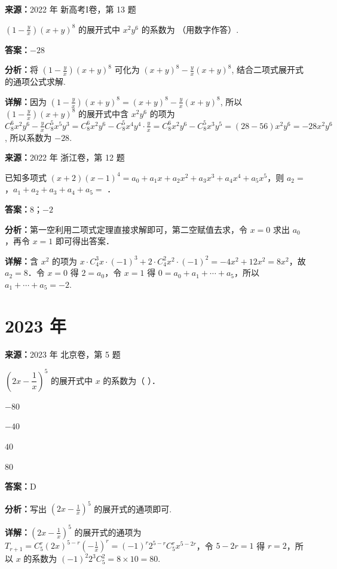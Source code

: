 \begin{question}[points=5]
\textbf{来源：}2022 年 新高考I卷，第 13 题\par
$\left(1 - \frac{y}{x}\right)(x + y)^8$ 的展开式中 $x^2 y^6$ 的系数为 （用数字作答）.
\fillin[{$-28$}]
\begin{solution}
\textbf{答案：}$-28$

\textbf{分析：}将 $\left(1 - \frac{y}{x}\right)(x + y)^8$ 可化为 $(x + y)^8 - \frac{y}{x}(x + y)^8$, 结合二项式展开式的通项公式求解.

\textbf{详解：}因为 $\left(1 - \frac{y}{x}\right)(x + y)^8 = (x + y)^8 - \frac{y}{x}(x + y)^8$, 所以 $\left(1 - \frac{y}{x}\right)(x + y)^8$ 的展开式中含 $x^2 y^6$ 的项为 $C_8^6 x^2 y^6 - \frac{y}{x} C_8^5 x^5 y^3 = C_8^6 x^2 y^6 - C_8^5 x^4 y^4 \cdot \frac{y}{x} = C_8^6 x^2 y^6 - C_8^5 x^3 y^5 = (28 - 56) x^2 y^6 = -28 x^2 y^6$, 所以系数为 $-28$.
\end{solution}
\end{question}

\begin{question}[points=6]
\textbf{来源：}2022 年 浙江卷，第 12 题\par
已知多项式 $(x+2)(x-1)^4 = a_0 + a_1 x + a_2 x^2 + a_3 x^3 + a_4 x^4 + a_5 x^5$，则 $a_2 =$ ，$a_1 + a_2 + a_3 + a_4 + a_5 =$ ．
\fillin[{$8$；$-2$}]
\begin{solution}
\textbf{答案：}$8$；$-2$

\textbf{分析：}第一空利用二项式定理直接求解即可，第二空赋值去求，令 $x=0$ 求出 $a_0$，再令 $x=1$ 即可得出答案．

\textbf{详解：}含 $x^2$ 的项为 $x\cdot C_4^3 x \cdot (-1)^3 + 2\cdot C_4^2 x^2 \cdot (-1)^2 = -4x^2+12x^2=8x^2$，故 $a_2=8$．令 $x=0$ 得 $2=a_0$，令 $x=1$ 得 $0=a_0+a_1+\cdots+a_5$，所以 $a_1+\cdots+a_5 = -2$.
\end{solution}
\end{question}

\section*{2023 年}

\begin{question}[points=4]
\textbf{来源：}2023 年 北京卷，第 5 题\par
$\left(2x - \dfrac{1}{x}\right)^5$ 的展开式中 $x$ 的系数为（ ）．
\begin{choices}
  \item $-80$
  \item $-40$
  \item $40$
  \item $80$
\end{choices}
\begin{solution}
\textbf{答案：}D

\textbf{分析：}写出 $\left(2x - \frac{1}{x}\right)^5$ 的展开式的通项即可.

\textbf{详解：}$\left(2x - \frac{1}{x}\right)^5$ 的展开式的通项为 $T_{r+1} = C_5^r (2x)^{5-r} \left(-\frac{1}{x}\right)^r = (-1)^r 2^{5-r} C_5^r x^{5-2r}$，令 $5-2r=1$ 得 $r=2$，所以 $x$ 的系数为 $(-1)^2 2^{3} C_5^2 = 8 \times 10 = 80$.
\end{solution}
\end{question}

